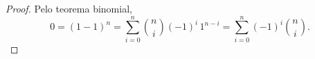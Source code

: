 \begin{questions}
\setcounter{question}{12}
\begin{solution}
\begin{proof}
	Pelo teorema binomial,
    \[0 = (1-1)^n = \sum_{i=0}^n \binom{n}{i} (-1)^i\,1^{n-i} = \sum_{i=0}^n (-1)^i \binom{n}{i}.\]
\end{proof}
\end{solution}

\end{questions}